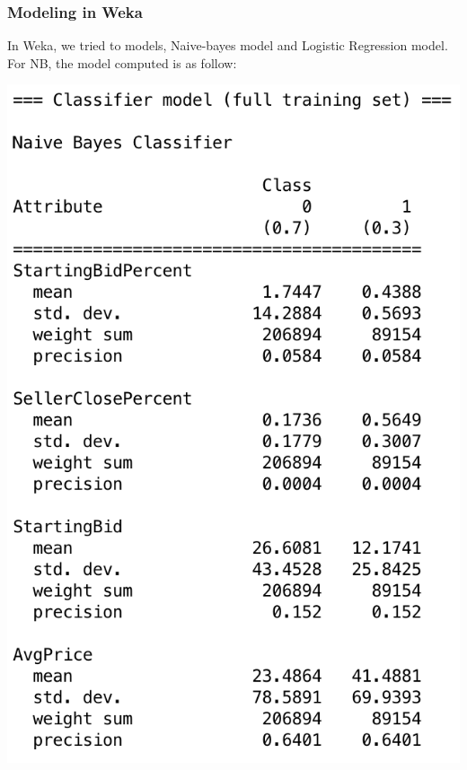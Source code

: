 \documentclass[CEJM,PDF]{cej} %
\begin{document}
\subsubsection{Modeling in Weka}
In Weka, we tried to models, Naive-bayes model and Logistic Regression model. For NB, the model computed is as follow:
\begin{center}
\includegraphics[scale=0.5]{weka-nb-model1.png}\hspace*{3em}

\end{center}
\end{document}
